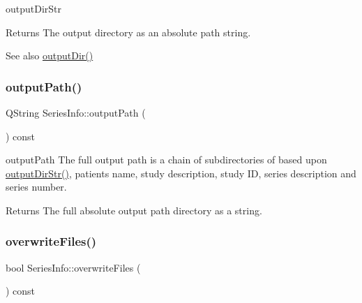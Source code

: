 output\+Dir\+Str 

\begin{DoxyReturn}{Returns}
The output directory as an absolute path string. 
\end{DoxyReturn}
\begin{DoxySeeAlso}{See also}
\hyperlink{class_series_info_af94b9048bc3b60b5d151f227299b394b}{output\+Dir()} 
\end{DoxySeeAlso}
\mbox{\label{class_series_info_a7088530574522d3d1123806c766402f2}} 
\subsubsection{\texorpdfstring{output\+Path()}{outputPath()}}
{\footnotesize\ttfamily Q\+String Series\+Info\+::output\+Path (\begin{DoxyParamCaption}{ }\end{DoxyParamCaption}) const\hspace{0.3cm}{\ttfamily [inline]}}



output\+Path The full output path is a chain of subdirectories of based upon \hyperlink{class_series_info_abc897c5c859293338e45d193ac62c674}{output\+Dir\+Str()}, patient\textquotesingle{}s name, study description, study ID, series description and series number. 

\begin{DoxyReturn}{Returns}
The full absolute output path directory as a string. 
\end{DoxyReturn}
\mbox{\label{class_series_info_a21fe1bd18d2f9e2b1f7ceb22e7ad98a3}} 
\subsubsection{\texorpdfstring{overwrite\+Files()}{overwriteFiles()}}
{\footnotesize\ttfamily bool Series\+Info\+::overwrite\+Files (\begin{DoxyParamCaption}{ }\end{DoxyParamCaption}) const\hspace{0.3cm}{\ttfamily [inline]}}



